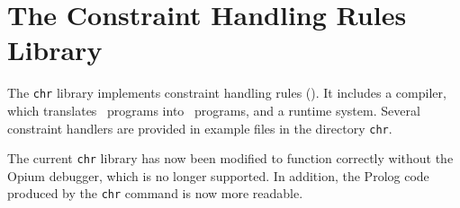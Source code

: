 %
% 
% 
% 
% 

%
%
%               

\newcommand{\OU}{$|$~}

\newcommand{\rep}{{\tt <=>}\ }
\newcommand{\aug}{{\tt ==>}\ }
\newcommand{\rul}{{\tt :-}\ }


\chapter{The Constraint Handling Rules Library}
\label{chapchr}


The {\tt chr} library implements constraint handling rules
 (\chrs).
It includes a compiler, which translates \chr\ programs into
\eclipse\ programs, and a runtime system.
Several constraint handlers are
provided in example files in the directory {\tt chr}.

The current {\tt chr} library has now been modified to function correctly
without the Opium debugger, which is no longer supported. In addition, the
Prolog code produced by the {\tt chr} command is now more readable.

